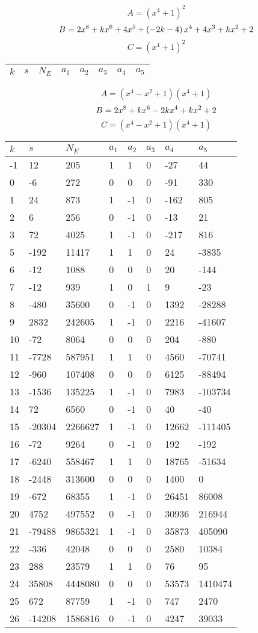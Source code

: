 \documentclass{amsart}
\begin{document}
$$A=(x^4
 + 1)^{2}$$
$$B=2\*x^8
 + k\*x^6
 + 4\*x^5
 + \left(-2\*k
 - 4\right) \*x^4
 + 4\*x^3
 + k\*x^2
 + 2$$
$$C=(x^4
 + 1)^{2}$$
\begin{longtable}{|l|l|l|lllll|}
\hline
$k$ & $s$ & $N_E$ & $a_1$ & $a_2$ & $a_3$ & $a_4$ & $a_5$\\
\hline
\hline
\end{longtable}
$$A=(x^4
 - x^2
 + 1)(x^4
 + 1)$$
$$B=2\*x^8
 + k\*x^6
 - 2\*k\*x^4
 + k\*x^2
 + 2$$
$$C=(x^4
 - x^2
 + 1)(x^4
 + 1)$$
\begin{longtable}{|l|l|l|lllll|}
\hline
$k$ & $s$ & $N_E$ & $a_1$ & $a_2$ & $a_3$ & $a_4$ & $a_5$\\
\hline
-1&12&205&1&1&0&-27&44\\
0&-6&272&0&0&0&-91&330\\
1&24&873&1&-1&0&-162&805\\
2&6&256&0&-1&0&-13&21\\
3&72&4025&1&-1&0&-217&816\\
5&-192&11417&1&1&0&24&-3835\\
6&-12&1088&0&0&0&20&-144\\
7&-12&939&1&0&1&9&-23\\
8&-480&35600&0&-1&0&1392&-28288\\
9&2832&242605&1&-1&0&2216&-41607\\
10&-72&8064&0&0&0&204&-880\\
11&-7728&587951&1&1&0&4560&-70741\\
12&-960&107408&0&0&0&6125&-88494\\
13&-1536&135225&1&-1&0&7983&-103734\\
14&72&6560&0&-1&0&40&-40\\
15&-20304&2266627&1&-1&0&12662&-111405\\
16&-72&9264&0&-1&0&192&-192\\
17&-6240&558467&1&1&0&18765&-51634\\
18&-2448&313600&0&0&0&1400&0\\
19&-672&68355&1&-1&0&26451&86008\\
20&4752&497552&0&-1&0&30936&216944\\
21&-79488&9865321&1&-1&0&35873&405090\\
22&-336&42048&0&0&0&2580&10384\\
23&288&23579&1&1&0&76&95\\
24&35808&4448080&0&0&0&53573&1410474\\
25&672&87759&1&-1&0&747&2470\\
26&-14208&1586816&0&-1&0&4247&39033\\

\end{longtable}
\end{document}
